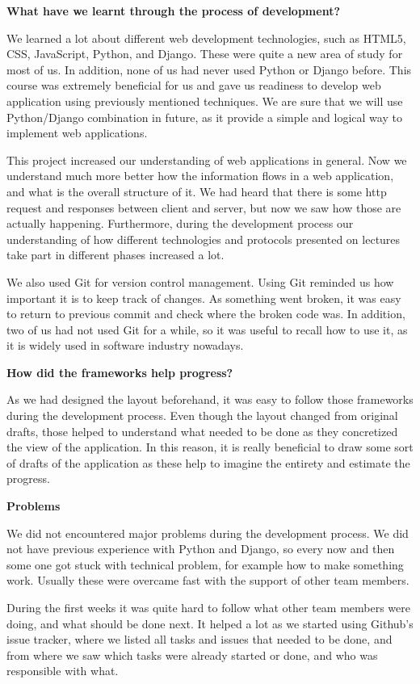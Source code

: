 \documentclass{sig-alt-release2}
\begin{document}
\textbf{What have we learnt through the process of development?}

We learned a lot about different web development technologies, such as HTML5,
CSS, JavaScript, Python, and Django. These were quite a new area of study for
most of us. In addition, none of us had never used Python or Django before. This
course was extremely beneficial for us and gave us readiness to develop web
application using previously mentioned techniques. We are sure that we will use
Python/Django combination in future, as it provide a simple and logical way to
implement web applications.

This project increased our understanding of web applications in general. Now we
understand much more better how the information flows in a web application, and
what is the overall structure of it. We had heard that there is some http
request and responses between client and server, but now we saw how those are
actually happening. Furthermore, during the development process our
understanding of how different technologies and protocols presented on lectures
take part in different phases increased a lot.

We also used Git for version control management. Using Git reminded us how
important it is to keep track of changes. As something went broken, it was easy
to return to previous commit and check where the broken code was. In addition,
two of us had not used Git for a while, so it was useful to recall how to use
it, as it is widely used in software industry nowadays.

\textbf{How did the frameworks help progress?}

As we had designed the layout beforehand, it was easy to follow those frameworks
during the development process. Even though the layout changed from original
drafts, those helped to understand what needed to be done as they concretized
the view of the application. In this reason, it is really beneficial to draw
some sort of drafts of the application as these help to imagine the entirety and
estimate the progress.

\textbf{Problems}

We did not encountered major problems during the development process. We did not
have previous experience with Python and Django, so every now and then some one
got stuck with technical problem, for example how to make something work.
Usually these were overcame fast with the support of other team members.

During the first weeks it was quite hard to follow what other team members were
doing, and what should be done next. It helped a lot as we started using
Github's issue tracker, where we listed all tasks and issues that needed to be
done, and from where we saw which tasks were already started or done, and who
was responsible with what.
\end{document}
